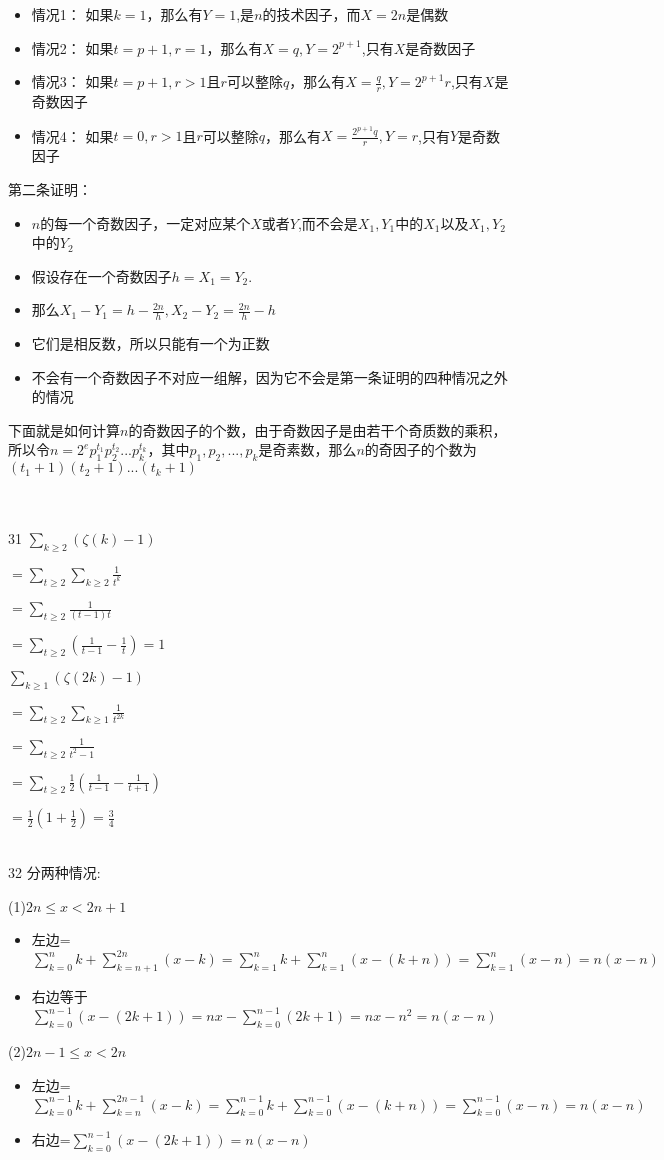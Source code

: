 \documentclass[onecolumn]{article}
\begin{document}
\begin{itemize}
	\item 情况1： 如果$k=1$，那么有$Y=1$,是$n$的技术因子，而$X=2n$是偶数
	\item 情况2： 如果$t=p+1,r=1$，那么有$X=q,Y=2^{p+1}$,只有$X$是奇数因子
	\item 情况3： 如果$t=p+1,r > 1$且$r$可以整除$q$，那么有$X=\frac{q}{r},Y=2^{p+1}r$,只有$X$是奇数因子
	\item 情况4： 如果$t=0,r > 1$且$r$可以整除$q$，那么有$X=\frac{2^{p+1}q}{r},Y=r$,只有$Y$是奇数因子
\end{itemize}
第二条证明：\par
\begin{itemize}
	\item $n$的每一个奇数因子，一定对应某个$X$或者$Y$,而不会是$X_{1},Y_{1}$中的$X_{1}$以及$X_{1},Y_{2}$中的$Y_{2}$
	\item 假设存在一个奇数因子$h=X_{1}=Y_{2}$.
	\item 那么$X_{1}-Y_{1}=h-\frac{2n}{h},X_{2}-Y_{2}=\frac{2n}{h}-h$
	\item 它们是相反数，所以只能有一个为正数
	\item 不会有一个奇数因子不对应一组解，因为它不会是第一条证明的四种情况之外的情况
\end{itemize}
下面就是如何计算$n$的奇数因子的个数，由于奇数因子是由若干个奇质数的乘积，所以令$n=2^{e}p_{1}^{t_{1}}p_{2}^{t_{2}}...p_{k}^{t_{k}}$，其中$p_{1},p_{2},...,p_{k}$是奇素数，那么$n$的奇因子的个数为$(t_{1}+1)(t_{2}+1)...(t_{k}+1)$ \par
~\\
~\\
31 $\sum_{k\geq 2}(\zeta (k)-1)$ \par
$=\sum_{t\geq 2}\sum_{k\geq 2}\frac{1}{t^{k}}$ \par
$=\sum_{t\geq 2}\frac{1}{(t-1)t}$ \par
$=\sum_{t\geq 2}(\frac{1}{t-1}-\frac{1}{t})=1$ \par
$\sum_{k\geq 1}(\zeta (2k)-1)$ \par
$=\sum_{t\geq 2}\sum_{k\geq 1}\frac{1}{t^{2k}}$ \par
$=\sum_{t\geq 2}\frac{1}{t^{2}-1}$ \par
$=\sum_{t\geq 2}\frac{1}{2}(\frac{1}{t-1}-\frac{1}{t+1})$ \par
$=\frac{1}{2}(1+\frac{1}{2})=\frac{3}{4}$ \par
~\\
32 分两种情况: \par
(1)$2n\leq x < 2n+1$
\begin{itemize}
	\item 左边=$\sum_{k=0}^{n}k+\sum_{k=n+1}^{2n}(x-k)=\sum_{k=1}^{n}k+\sum_{k=1}^{n}(x-(k+n))=\sum_{k=1}^{n}(x-n)=n(x-n)$
	\item 右边等于$\sum_{k=0}^{n-1}(x-(2k+1))=nx-\sum_{k=0}^{n-1}(2k+1)=nx-n^{2}=n(x-n)$
\end{itemize}


(2)$2n-1\leq x < 2n$
\begin{itemize}
	\item 左边=$\sum_{k=0}^{n-1}k+\sum_{k=n}^{2n-1}(x-k)=\sum_{k=0}^{n-1}k+\sum_{k=0}^{n-1}(x-(k+n))=\sum_{k=0}^{n-1}(x-n)=n(x-n)$
	\item 右边=$\sum_{k=0}^{n-1}(x-(2k+1))=n(x-n)$
\end{itemize}
~\\
\end{document}
